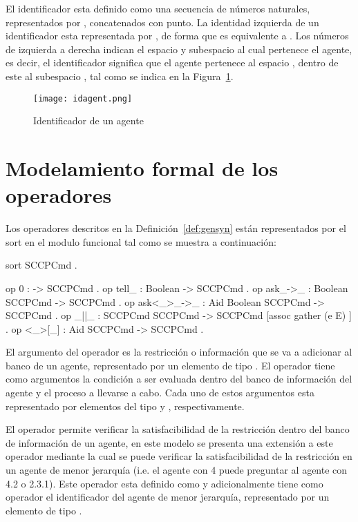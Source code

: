 El identificador esta definido como una secuencia de n\'umeros naturales, representados por , concatenados con punto. La identidad izquierda de un identificador esta representada por , de forma que  es equivalente a . Los n\'umeros de izquierda a derecha indican el espacio y subespacio al cual pertenece el agente, es decir, el identificador  significa que el agente pertenece al espacio , dentro de este al subespacio , tal como se indica en la Figura~\ref{fig:agentid}.

\begin{figure}[htbp] %
   \centering
   \texttt{[image: idagent.png]} 
   \caption{Identificador de un agente}
   \label{fig:agentid}
\end{figure}

\section{Modelamiento formal de los operadores}
\label{syntax.rew}

Los operadores descritos en la Definici\'on~\ref{def:gensyn} est\'an representados por el sort  en el modulo funcional  tal como se muestra a continuaci\'on:

\begin{maude}
  sort SCCPCmd .

  op 0 : -> SCCPCmd . 
  op tell_ : Boolean -> SCCPCmd . 
  op ask_->_ : Boolean SCCPCmd -> SCCPCmd .
  op ask<_>_->_ : Aid Boolean SCCPCmd -> SCCPCmd .
  op _||_ : SCCPCmd SCCPCmd -> SCCPCmd [assoc gather (e E) ] .
  op <_>[_] : Aid SCCPCmd -> SCCPCmd .
\end{maude}

El argumento del operador  es la restricci\'on o informaci\'on que se va a adicionar al banco de un agente, representado por un elemento de tipo . El operador  tiene como argumentos la condici\'on a ser evaluada dentro del banco de informaci\'on del agente y el proceso a llevarse a cabo. Cada uno de estos argumentos esta representado por elementos del tipo  y , respectivamente.

El operador  permite verificar la satisfacibilidad de la restricci\'on dentro del banco de informaci\'on de un agente, en este modelo se presenta una extensi\'on a este operador mediante la cual se puede verificar la satisfacibilidad de la restricci\'on en un agente de menor jerarqu\'ia (i.e. el agente con  4 puede preguntar al agente con  4.2 o 2.3.1). Este operador esta definido como  y adicionalmente tiene como operador el identificador del agente de menor jerarqu\'ia, representado por un elemento de tipo .

